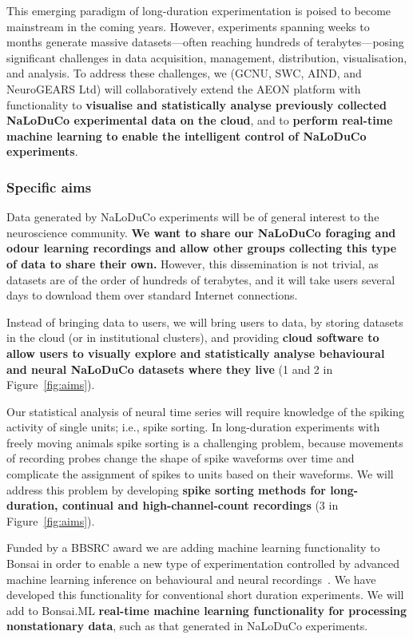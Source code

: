 This emerging paradigm of long-duration experimentation is poised to become
mainstream in the coming years.
%
However, experiments spanning weeks to months generate massive datasets—often
reaching hundreds of terabytes—posing significant challenges in data
acquisition, management, distribution, visualisation, and analysis.
%
To address these challenges, we (GCNU, SWC, AIND, and NeuroGEARS Ltd) will
collaboratively extend the AEON platform with functionality to
\textbf{visualise and statistically analyse previously collected NaLoDuCo
experimental data on the cloud}, and to \textbf{perform real-time machine learning to enable the
intelligent control of NaLoDuCo experiments}.

\subsubsection{Specific aims}

Data generated by NaLoDuCo experiments will be of general interest to the
neuroscience community. \textbf{We want to share our NaLoDuCo foraging and odour
learning recordings and allow other groups collecting this type of data to
share their own.}
%
However, this dissemination is not trivial, as datasets are of the order of
hundreds of terabytes, and it will take users several days to download them
over standard Internet connections.

Instead of bringing data to users, we will bring users to data, by storing
datasets in the cloud (or in institutional clusters), and providing
\textbf{cloud software to allow users to visually explore and statistically
analyse behavioural and neural NaLoDuCo datasets where they live}
(1 and 2 in Figure~\ref{fig:aims}).

Our statistical analysis of neural time series will require knowledge of the
spiking activity of single units; i.e., spike sorting. In long-duration
experiments with freely moving animals spike sorting is a challenging problem,
because movements of recording probes change the shape of spike waveforms over
time and complicate the assignment of spikes to units based on their waveforms.
We will address this problem by developing \textbf{spike sorting methods for
long-duration, continual and high-channel-count recordings} (3 in
Figure~\ref{fig:aims}).

Funded by a BBSRC award we are adding machine learning functionality to Bonsai
in order to enable a new type of experimentation controlled by advanced machine
learning inference on behavioural and neural
recordings~\citep[Bonsai.ML,][]{bonsaiML25}. We have developed this
functionality for conventional short duration experiments. We will add to
Bonsai.ML \textbf{real-time machine learning functionality for processing
nonstationary data}, such as that generated in NaLoDuCo experiments.

